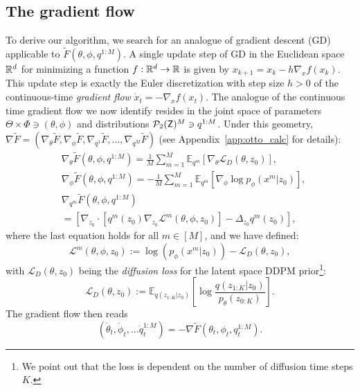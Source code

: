 \documentclass[twoside]{article}
\begin{document}
\subsection{The gradient flow}
\label{sec:gradient_flow}
To derive our algorithm, we search for an analogue of gradient descent (GD) applicable to $\tilde{F}(\theta, \phi, q^{1:M})$. A single update step of GD in the Euclidean space $\mathbb{R}^d$ for minimizing a function $f:\mathbb{R}^d\to\mathbb{R}$ is given by $x_{k+1}=x_k-h\nabla_x f(x_k)$. This update step is exactly the Euler discretization with step size $h>0$ of the continuous-time \emph{gradient flow} $\dot{x}_t=-\nabla_xf(x_t)$.
The analogue of the continuous time gradient flow we now identify resides in the joint space of parameters $\Theta\times \Phi\ni (\theta, \phi)$ and distributions $\mathcal{P}_2({\mathsf{Z}})^M\ni q^{1:M}$. Under this geometry,
$\nabla \tilde{F}=(\nabla_\theta \tilde{F}, \nabla_\phi \tilde{F},\nabla_{q^1} \tilde{F}, \dots,\nabla_{q^M} \tilde{F})$ (see Appendix~\ref{app:otto_calc} for details):
\begin{align}
    &\nabla_\theta \tilde{F}(\theta, \phi, q^{1:M}) = \frac{1}{M}\sum_{m=1}^M\mathbb{E}_{q^m}\left[\nabla_{\theta} \mathcal{L}_D(\theta, z_{0})\right],
    \label{eq:theta_ode} \\
    &\nabla_\phi \tilde{F}(\theta, \phi, q^{1:M}) 
    =-\frac{1}{M}\sum_{m=1}^M\mathbb{E}_{q^m}\left[\nabla_{\phi} \log p_{\phi}( x^m | z_0)\right],\label{eq:phi_ode} \\\nonumber
    &\nabla_{q^m} \tilde{F}(\theta, \phi, q^{1:M}) \\ 
    &= [\nabla_{z_0} \cdot \left[
        q^m(z_0) \nabla_{z_0}  \mathcal{L}^m(\theta, \phi, z_0) \right]- \Delta_{z_0} q^m(z_0)],\label{eq:fpe_qt} 
\end{align}
where the last equation holds for all $m\in [M]$, and we have defined:
\begin{equation}\label{eq:single_loss_drift}
    \mathcal{L}^m(\theta, \phi, z_0):=\log(p_{\phi}( x^m|z_0))-\mathcal{L}_D(\theta, z_0), 
\end{equation}
with $\mathcal{L}_D(\theta,z_0)$ being the \emph{diffusion loss} for the latent space \gls*{DDPM} prior\footnote{We point out that the loss is dependent on the number of diffusion time steps $K$.}:
\begin{equation}
\mathcal{L}_D(\theta,z_0):=\mathbb{E}_{q(z_{1:K}|z_{0})}\left[ \log \frac{{q(z_{1:K}|z_{0})}}{p_{\theta}(z_{0:K})} \right].
\end{equation}
The gradient flow then reads 
\begin{equation}\label{eq:flow}
(\dot{\theta}_t,\dot{\phi}_t,\dots \dot{q}^{1:M}_t)=-\nabla \tilde{F}(\theta_t,\phi_t,q^{1:M}_t).
\end{equation}
\end{document}
